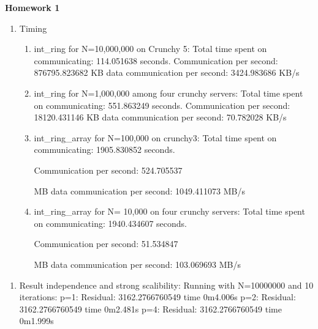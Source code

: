 \documentclass[letterpaper]{article}
\title{}
\author{Kamran-Ubuntu }
\date{2015-03-16}
\newcommand\liststyleLi{%
\renewcommand\theenumi{\arabic{enumi}}
\renewcommand\theenumii{\arabic{enumii}}
\renewcommand\theenumiii{\arabic{enumiii}}
\renewcommand\theenumiv{\arabic{enumiv}}
\renewcommand\labelenumi{\theenumi.}
\renewcommand\labelenumii{\theenumii.}
\renewcommand\labelenumiii{\theenumiii.}
\renewcommand\labelenumiv{\theenumiv.}
}
\begin{document}
{\centering\bfseries
Homework 1
\par}

\liststyleLi
\begin{enumerate}
\item Timing

\begin{enumerate}
\item int\_ring for N=10,000,000 on Crunchy 5:\newline
Total time spent on communicating: 114.051638 seconds. \newline
Communication per second: 876795.823682 \newline
KB data communication per second: 3424.983686 KB/s
\item int\_ring for N=1,000,000 among four crunchy servers:\newline
Total time spent on communicating: 551.863249 seconds. \newline
Communication per second: 18120.431146 \newline
KB data communication per second: 70.782028 KB/s
\item int\_ring\_array for N=100,000 on crunchy3:\newline
Total time spent on communicating: 1905.830852 seconds. 

Communication per second: 524.705537 

MB data communication per second: 1049.411073 MB/s
\item int\_ring\_array for N= 10,000 on four crunchy servers:\newline
Total time spent on communicating: 1940.434607 seconds. 

Communication per second: 51.534847 

MB data communication per second: 103.069693 MB/s
\end{enumerate}
\end{enumerate}
\begin{enumerate}
\item Result independence and strong scalibility:
	Running with N=10000000 and 10 iterations:\newline
	p=1:\newline
	Residual: 3162.2766760549
	time	0m4.006s
	\newline\newline
	p=2:\newline
	Residual: 3162.2766760549
	time	0m2.481s
	\newline\newline
	p=4:\newline
	Residual: 3162.2766760549
	time	0m1.999s
\end{enumerate}
\end{document}
